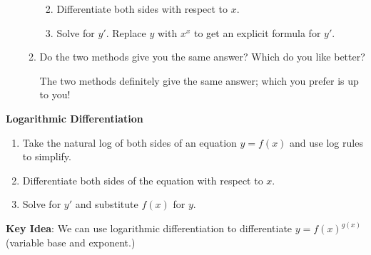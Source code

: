 \documentclass[main]{subfiles}
\begin{document}
\begin{enumerate}
\begin{enumerate}
\begin{enumerate}
    \solonly{\[\ln y = \ln (x^x) = x \ln x\]}

    \item
    \begin{problem}[\vfill]
      Differentiate both sides with respect to $x$.
    \end{problem}

    \solonly{\[\frac{y'}{y} = 1 \cdot
      \ln x + x \cdot \frac{1}{x} = \ln x + 1\]}

    \item
    \begin{problem}[\vfill]
      Solve for $y'$. Replace $y$ with $x^x$ to get an explicit formula for $y'$.
    \end{problem}

    \solonly{\[f'(x) = f(x) (\ln x + 1) = x^x (\ln x + 1)\]}
    \end{enumerate}

  \item
    \begin{problem}
      Do the two methods give you the same answer?  Which do you like
      better? 
    \end{problem}
    \pspace{\vfill}

    \begin{solution}
      The two methods definitely give the same answer; which you prefer is
      up to you!
    \end{solution}

  \end{enumerate}
\end{enumerate}

\begin{framed}
    \textbf{Logarithmic Differentiation}
    \begin{enumerate}
        \item Take the natural log of both sides of an equation $y=f(x)$ and use log rules to simplify.
        \item Differentiate both sides of the equation with respect to $x$.
        \item Solve for $y'$ and substitute $f(x)$ for $y$. 
    \end{enumerate}
\end{framed}

\newpage

\textbf{Key Idea}: We can use logarithmic differentiation to differentiate $y=f(x)^{g(x)}$ (variable base and exponent.)

\end{document}
